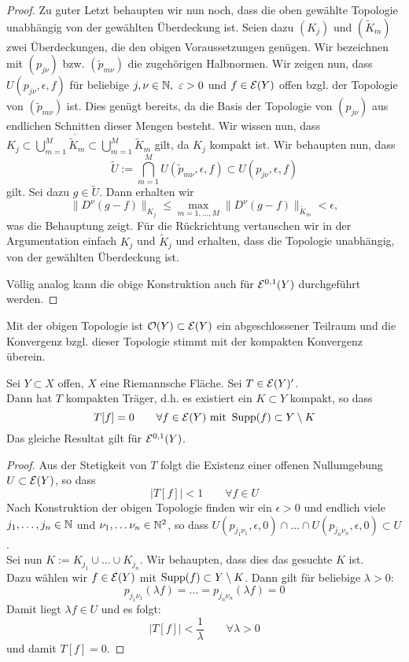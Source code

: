 \begin{proof}
  Zu guter Letzt behaupten wir nun noch, dass die oben gewählte
  Topologie unabhängig von der gewählten Überdeckung ist. Seien dazu
  $(K_j)$ und $(\tilde K_m)$ zwei Überdeckungen, die den obigen
  Voraussetzungen genügen. Wir bezeichnen mit $(p_{j\nu})$
  bzw. $(\tilde p_{m\nu})$ die zugehörigen Halbnormen. Wir zeigen nun,
  dass $U(p_{j\nu}, \epsilon, f)$ für beliebige $j, \nu \in\mathbb{N},\
  \varepsilon > 0$ und $f \in \mathcal{E}(Y)$ offen bzgl. der Topologie von
  $(\tilde p_{m\nu})$ ist. Dies genügt bereits, da die Basis der
  Topologie von $(p_{j\nu})$ aus endlichen Schnitten dieser Mengen
  besteht. Wir wissen nun, dass $K_j \subset \bigcup_{m=1}^M
  \mathring{\tilde K_m} \subset \bigcup_{m=1}^M \tilde K_m$ gilt, da
  $K_j$ kompakt ist. Wir behaupten nun, dass
  \[
  \tilde U := \bigcap_{m=1}^M U(\tilde p_{m\nu}, \epsilon, f) \subset
  U(p_{j\nu}, \epsilon, f)
  \]
  gilt. Sei dazu $g \in \tilde U$. Dann erhalten wir
  \[
  \|D^\nu(g-f)\|_{K_j} \leq \max_{m=1, \dots, M} \|D^\nu(g-f)\|_{\tilde
    K_m} < \epsilon,
  \]
  was die Behauptung zeigt. Für die Rückrichtung vertauschen wir in
  der Argumentation einfach $K_j$ und $\tilde K_j$ und erhalten, dass
  die Topologie unabhängig, von der gewählten Überdeckung ist.
  
  Völlig analog kann die obige Konstruktion auch für $\mathcal{E}^{0,1}(Y)$
  durchgeführt werden.
\end{proof}

\begin{cor}
  Mit der obigen Topologie ist $\mathcal{O}(Y) \subset \mathcal{E}(Y)$ ein
  abgeschlossener Teilraum und die Konvergenz bzgl. dieser Topologie
  stimmt mit der kompakten Konvergenz überein.
\end{cor}

\begin{lemma}
  \label{lemma:kompakter-träger-funktional}
  Sei $Y \subset X$ offen, $X$ eine Riemannsche Fläche. Sei $T \in
  \mathcal{E}(Y)'$. \\
  Dann hat $T$ kompakten Träger, d.h. es existiert ein $K \subset Y$
  kompakt, so dass
  \[
  T[f] = 0 \qquad \forall f \in \mathcal{E}(Y) \text{ mit } \operatorname{Supp}(f) \subset
  Y \setminus K
  \]
  Das gleiche Resultat gilt für $\mathcal{E}^{0,1}(Y)$.
\end{lemma}

\begin{proof}
  Aus der Stetigkeit von $T$ folgt die Existenz einer offenen
  Nullumgebung $U \subset \mathcal{E}(Y)$, so dass
  \[
  |T[f]| < 1 \qquad \forall f \in U
  \]
  Nach Konstruktion der obigen Topologie finden wir ein $\epsilon > 0$
  und endlich viele $j_1, \dots, j_n \in \mathbb{N}$ und $\nu_1, \dots \nu_n
  \in \mathbb{N}^2$, so dass $U(p_{j_1\nu_1}, \epsilon, 0) \cap \dots \cap
  U(p_{j_n\nu_n}, \epsilon, 0) \subset U$. \\
  Sei nun  $K := K_{j_1} \cup \dots \cup K_{j_n}$. Wir behaupten, dass
  dies das gesuchte $K$ ist. \\
  Dazu wählen wir $f \in \mathcal{E}(Y)$ mit $\operatorname{Supp}(f) \subset Y \setminus
  K$. Dann gilt für beliebige
  $\lambda > 0$:
  \[
  p_{j_1\nu_1}(\lambda f) = \dots = p_{j_n\nu_n}(\lambda f) = 0
  \]
  Damit liegt $\lambda f \in U$ und es folgt:
  \[
  |T[f]| < \frac1\lambda \qquad \forall \lambda >0
  \]
  und damit $T[f] = 0$.
\end{proof}

